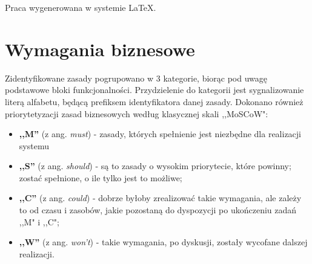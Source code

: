 \documentclass[11pt,oneside,a4paper,titlepage,onecolumn]{article}
\begin{document}
Praca wygenerowana w systemie \LaTeX.

\section{Wymagania biznesowe}

Zidentyfikowane zasady pogrupowano w 3 kategorie, biorąc pod uwagę podstawowe bloki funkcjonalności. Przydzielenie
do kategorii jest sygnalizowanie literą alfabetu, będącą prefiksem identyfikatora danej zasady. Dokonano
również priorytetyzacji zasad biznesowych według klasycznej skali ,,MoSCoW":

\begin{itemize}
	\item \textbf{,,M''} (z ang. \textit{must}) - zasady, których spełnienie jest niezbędne dla realizacji systemu
	\item \textbf{,,S''} (z ang. \textit{should}) - są to zasady o wysokim priorytecie, które powinny;
	zostać spełnione, o ile tylko jest to możliwe;
	\item \textbf{,,C''} (z ang. \textit{could}) - dobrze byłoby zrealizować takie wymagania, ale zależy to od czasu
	i zasobów, jakie pozostaną do dyspozycji po ukończeniu zadań ,,M" i ,,C";
	\item \textbf{,,W''} (z ang. \textit{won't}) - takie wymagania, po dyskusji, zostały wycofane dalszej realizacji.
\end{itemize}
\end{document}
